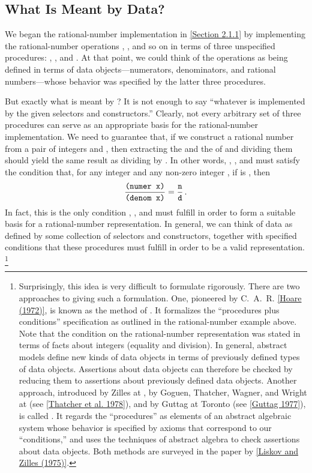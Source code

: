 \subsection{What Is Meant by Data?}
\label{Section 2.1.3}

We began the rational-number implementation in \cref{Section 2.1.1} by implementing the rational-number operations , , and so on in terms of three unspecified procedures:
, , and .
At that point, we could think of the operations as being defined in terms of data objects---numerators, denominators, and rational numbers---whose behavior was specified by the latter three procedures.

But exactly what is meant by ?
It is not enough to say “whatever is implemented by the given selectors and constructors.”
Clearly, not every arbitrary set of three procedures can serve as an appropriate basis for the rational-number implementation.
We need to guarantee that, if we construct a rational number  from a pair of integers  and , then extracting the  and the  of  and dividing them should yield the same result as dividing  by .
In other words, , , and  must satisfy the condition that, for any integer  and any non-zero integer , if  is , then
\[
	\frac{\texttt{(numer x)}}{\texttt{(denom x)}}
	=
	\frac{\texttt{n}}{\texttt{d}} \,.
\]
In fact, this is the only condition , , and  must fulfill in order to form a suitable basis for a rational-number representation.
In general, we can think of data as defined by some collection of selectors and constructors, together with specified conditions that these procedures must fulfill in order to be a valid representation.%
\footnote{
	Surprisingly, this idea is very difficult to formulate rigorously.
	There are two approaches to giving such a formulation.
	One, pioneered by C.~A.~R. \cref{Hoare (1972)}, is known as the method of .
	It formalizes the “procedures plus conditions” specification as outlined in the rational-number example above.
	Note that the condition on the rational-number representation was stated in terms of facts about integers (equality and division).
	In general, abstract models define new kinds of data objects in terms of previously defined types of data objects.
	Assertions about data objects can therefore be checked by reducing them to assertions about previously defined data objects.
	Another approach, introduced by Zilles at , by Goguen, Thatcher, Wagner, and Wright at  (see \cref{Thatcher et al. 1978}), and by Guttag at Toronto (see \cref{Guttag 1977}), is called .
	It regards the “procedures” as elements of an abstract algebraic system whose behavior is specified by axioms that correspond to our “conditions,” and uses the techniques of abstract algebra to check assertions about data objects.
	Both methods are surveyed in the paper by \cref{Liskov and Zilles (1975)}.
}

